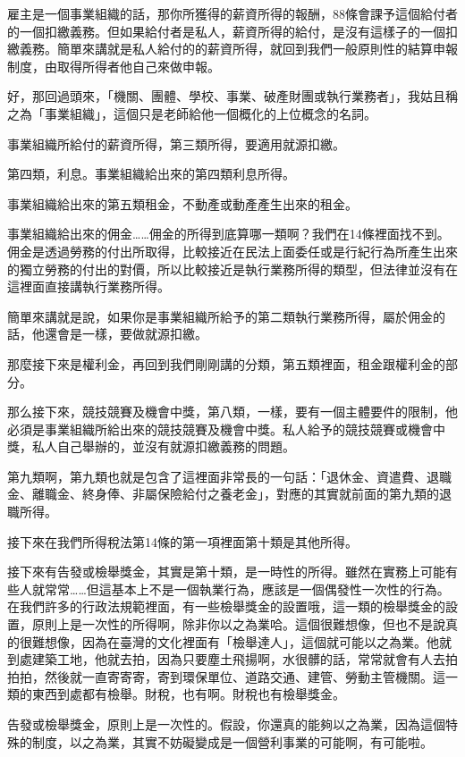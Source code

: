 \documentclass[oneside,sub3section]{ctexbook}
\begin{document}
雇主是一個事業組織的話，那你所獲得的薪資所得的報酬，88條會課予這個給付者的一個扣繳義務。但如果給付者是私人，薪資所得的給付，是沒有這樣子的一個扣繳義務。簡單來講就是私人給付的的薪資所得，就回到我們一般原則性的結算申報制度，由取得所得者他自己來做申報。

好，那回過頭來，「機關、團體、學校、事業、破產財團或執行業務者」，我姑且稱之為「事業組織」，這個只是老師給他一個概化的上位概念的名詞。

事業組織所給付的薪資所得，第三類所得，要適用就源扣繳。

第四類，利息。事業組織給出來的第四類利息所得。

事業組織給出來的第五類租金，不動產或動產產生出來的租金。

事業組織給出來的佣金\ldots\ldots 佣金的所得到底算哪一類啊？我們在14條裡面找不到。佣金是透過勞務的付出所取得，比較接近在民法上面委任或是行紀行為所產生出來的獨立勞務的付出的對價，所以比較接近是執行業務所得的類型，但法律並沒有在這裡面直接講執行業務所得。

簡單來講就是說，如果你是事業組織所給予的第二類執行業務所得，屬於佣金的話，他還會是一樣，要做就源扣繳。

那麼接下來是權利金，再回到我們剛剛講的分類，第五類裡面，租金跟權利金的部分。

那么接下來，競技競賽及機會中獎，第八類，一樣，要有一個主體要件的限制，他必須是事業組織所給出來的競技競賽及機會中獎。私人給予的競技競賽或機會中獎，私人自己舉辦的，並沒有就源扣繳義務的問題。

第九類啊，第九類也就是包含了這裡面非常長的一句話：「退休金、資遣費、退職金、離職金、終身俸、非屬保險給付之養老金」，對應的其實就前面的第九類的退職所得。

接下來在我們所得稅法第14條的第一項裡面第十類是其他所得。

接下來有告發或檢舉獎金，其實是第十類，是一時性的所得。雖然在實務上可能有些人就常常\ldots\ldots 但這基本上不是一個執業行為，應該是一個偶發性一次性的行為。在我們許多的行政法規範裡面，有一些檢舉獎金的設置哦，這一類的檢舉獎金的設置，原則上是一次性的所得啊，除非你以之為業哈。這個很難想像，但也不是說真的很難想像，因為在臺灣的文化裡面有「檢舉達人」，這個就可能以之為業。他就到處建築工地，他就去拍，因為只要塵土飛揚啊，水很髒的話，常常就會有人去拍拍拍，然後就一直寄寄寄，寄到環保單位、道路交通、建管、勞動主管機關。這一類的東西到處都有檢舉。財稅，也有啊。財稅也有檢舉獎金。

告發或檢舉獎金，原則上是一次性的。假設，你還真的能夠以之為業，因為這個特殊的制度，以之為業，其實不妨礙變成是一個營利事業的可能啊，有可能啦。
\end{document}
